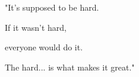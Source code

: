 \dedicatory

"It's supposed to be hard.

If it wasn't hard, 

everyone would do it.

The hard... 
is what makes it great."

\enddedicatory